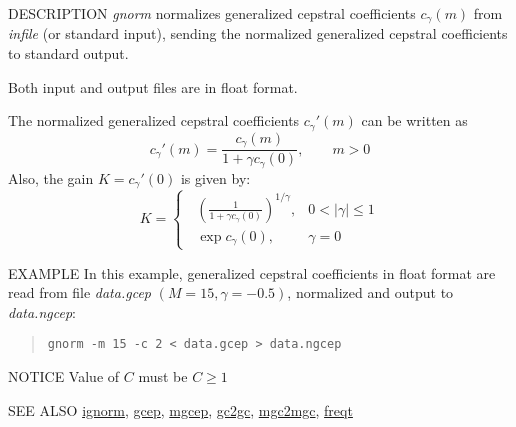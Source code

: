\begin{synopsis}
\item [gnorm] [ --m $M$ ] [ --g $G$ ] [ --c $C$ ] [ {\em infile} ]
\end{synopsis}

\begin{qsection}{DESCRIPTION}
{\em gnorm} normalizes generalized cepstral coefficients $c_\gamma(m)$ 
from {\em infile} (or standard input), 
sending the normalized generalized cepstral coefficients to standard output.

Both input and output files are in float format.

The normalized generalized cepstral coefficients $c_\gamma'(m)$
can be written as
\begin{displaymath}
c_\gamma'(m) = \frac{c_\gamma(m)}{1+\gamma c_\gamma(0)}, \qquad m>0
\end{displaymath}
Also, the gain $K = c_\gamma'(0)$ is given by:
\begin{displaymath}
K = \begin{cases} \;\;\displaystyle
          \left(\frac{1}{1+\gamma c_\gamma(0)}\right)^{1/\gamma},
                & 0<|\gamma|\leq 1 \\ \;\;\displaystyle
          \exp c_\gamma(0),  & \gamma=0
        \end{cases}
\end{displaymath}
\end{qsection}

\begin{options}
\end{options}

\begin{qsection}{EXAMPLE}
In this example, generalized cepstral coefficients in float format
are read from file {\em data.gcep} $(M=15, \gamma=-0.5)$,
normalized and output to {\em data.ngcep}:
\begin{quote}
 \verb!gnorm -m 15 -c 2 < data.gcep > data.ngcep!
\end{quote} 
\end{qsection}

\begin{qsection}{NOTICE}
Value of $C$ must be $C \geq 1$
\end{qsection}

\begin{qsection}{SEE ALSO}
\hyperlink{ignorm}{ignorm},
\hyperlink{gcep}{gcep},
\hyperlink{mgcep}{mgcep},
\hyperlink{gc2gc}{gc2gc},
\hyperlink{mgc2mgc}{mgc2mgc},
\hyperlink{freqt}{freqt}
\end{qsection}
